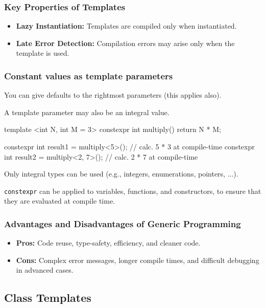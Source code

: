 \subsubsection{Key Properties of Templates}
\begin{itemize}
    \item \textbf{Lazy Instantiation:} Templates are compiled only when instantiated.
    \item \textbf{Late Error Detection:} Compilation errors may arise only when the template is used.
\end{itemize}

\subsubsection{Constant values as template parameters}

You can give defaults to the rightmost parameters (this applies also).

A template parameter may also be an integral value.

\begin{codeblock}[language=C++]
template <int N, int M = 3>
constexpr int multiply() {
    return N * M;
}

constexpr int result1 = multiply<5>();    // calc. 5 * 3 at compile-time
constexpr int result2 = multiply<2, 7>(); // calc. 2 * 7 at compile-time
\end{codeblock}

Only integral types can be used (e.g., integers, enumerations, pointers, ...).

\texttt{constexpr} can be applied to variables, functions, and constructors, to ensure that they are evaluated at compile time.

\subsubsection{Advantages and Disadvantages of Generic Programming}
\begin{itemize}
    \item \textbf{Pros:} Code reuse, type-safety, efficiency, and cleaner code.
    \item \textbf{Cons:} Complex error messages, longer compile times, and difficult debugging in advanced cases.
\end{itemize}

\subsection{Class Templates}

